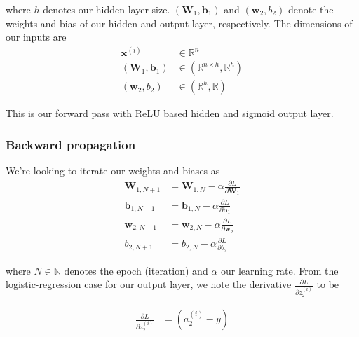 \documentclass[varwidth,border=2cm]{standalone}
\begin{document}
where $h$ denotes our hidden layer size. $(\bm W_1, \bm b_1)$ and $(\bm w_2, b_2)$ denote the weights and bias of our hidden and output layer, respectively. The dimensions of our inputs are
\begin{align}
\bm x^{(i)} &\in \mathbb{R}^{n} \\
(\bm W_1, \bm b_1) &\in (\mathbb{R}^{n \times h}, \mathbb{R}^h) \nonumber \\
(\bm w_2, b_2) &\in (\mathbb{R}^{h}, \mathbb{R}) \nonumber
\end{align}

This is our forward pass with ReLU based hidden and sigmoid output layer.

\subsubsection{Backward propagation}
We're looking to iterate our weights and biases as
\begin{align}
\bm W_{1, N+1} &= \bm W_{1, N} - \alpha\frac{\partial L}{\partial \bm W_1}  \\
\bm b_{1, N+1} &= \bm b_{1, N} - \alpha\frac{\partial L}{\partial \bm b_1} \nonumber \\
\bm w_{2, N+1} &= \bm w_{2, N} - \alpha\frac{\partial L}{\partial \bm w_2} \nonumber \\
    b_{2, N+1} &=     b_{2, N} - \alpha\frac{\partial L}{\partial     b_2} \nonumber
\end{align}

where $N \in \mathbb{N}$ denotes the epoch (iteration) and $\alpha$ our learning rate. From the logistic-regression case for our output layer, we note the derivative $\frac{\partial L}{\partial z_2^{(i)}}$ to be

\begin{align}
\frac{\partial L}{\partial z_2^{(i)}} &= (a_2 ^{(i)} - y)
\label{dLdz2}
\end{align}
\end{document}
